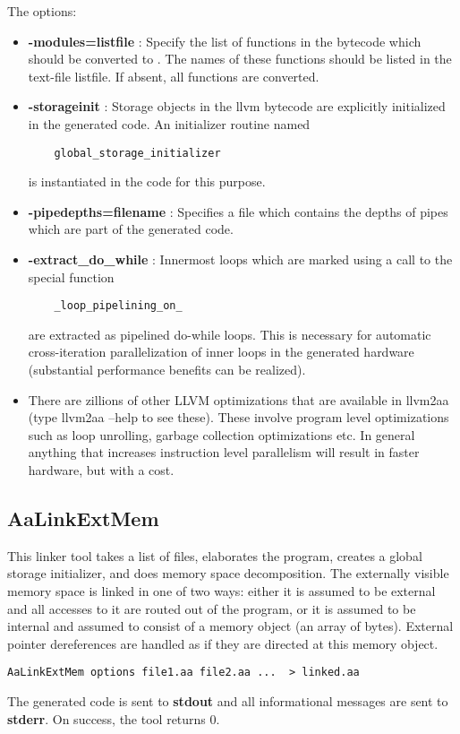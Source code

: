 The options:
\begin{itemize}
\item {\bf -modules=listfile} : Specify the list of functions in the bytecode
which should be converted to \Aa.   The names of these functions should be
listed in the text-file listfile. If absent, all functions
are converted.
\item {\bf -storageinit} :  Storage objects in the llvm bytecode
are explicitly initialized in the generated \Aa code.   An initializer
routine named
\begin{verbatim}
    global_storage_initializer
\end{verbatim}
is instantiated in
the \Aa code for this purpose.
\item {\bf -pipedepths=filename} : Specifies a file which contains
the depths of pipes which are part of the generated \Aa code.
\item {\bf -extract\_do\_while} : Innermost loops which are marked
using a call to the special function 
\begin{verbatim}
    _loop_pipelining_on_
\end{verbatim}
are extracted as pipelined do-while loops.  This is necessary
for automatic cross-iteration parallelization of inner loops in the 
generated hardware (substantial performance benefits can be
realized).
\item There are zillions of other LLVM optimizations that are
available in llvm2aa (type llvm2aa --help to see these).  These
involve program level optimizations such as loop unrolling,
garbage collection optimizations etc. In general anything that
increases instruction level parallelism will result in faster
hardware, but with a cost.
\end{itemize}

\subsection{{\bf AaLinkExtMem}}

This linker tool takes a list of \Aa files, elaborates the program,
creates a global storage initializer, and
does memory space decomposition.  The externally visible memory space is
linked in one of two ways: either it is assumed to be external
and all accesses to it are routed out of the \Aa program,
or it is assumed to be internal and assumed to consist of
a memory object (an array of bytes).  External pointer dereferences
are handled as if they are directed at this memory object.
\begin{verbatim}
AaLinkExtMem options file1.aa file2.aa ...  > linked.aa
\end{verbatim}
The generated \Aa code is sent to {\bf stdout} and all informational
messages are sent to {\bf stderr}.  On success, the tool returns 0.

